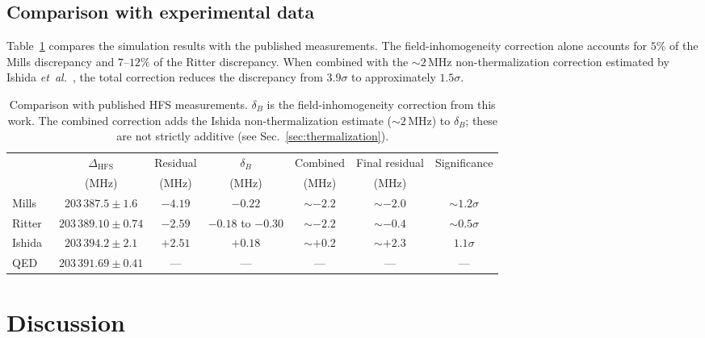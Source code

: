 \documentclass[twocolumn,pra,aps,superscriptaddress,floatfix,10pt]{revtex4-2}
\begin{document}
\subsection{Comparison with experimental data}
\label{sec:comparison}

Table~\ref{tab:comparison} compares the simulation results with the published measurements. The field-inhomogeneity correction alone accounts for $5\%$ of the Mills discrepancy and $7$--$12\%$ of the Ritter discrepancy. When combined with the $\sim 2$\,MHz non-thermalization correction estimated by Ishida \textit{et~al.}~\cite{Ishida2014}, the total correction reduces the discrepancy from $3.9\sigma$ to approximately $1.5\sigma$.

\begin{table}[t]
\caption{Comparison with published HFS measurements. $\delta_B$ is the field-inhomogeneity correction from this work. The combined correction adds the Ishida non-thermalization estimate ($\sim 2$\,MHz) to $\delta_B$; these are not strictly additive (see Sec.~\ref{sec:thermalization}).}
\label{tab:comparison}
\begin{ruledtabular}
\begin{tabular}{lcccccc}
 & $\Delta_\mathrm{HFS}$ & Residual & $\delta_B$ & Combined & Final residual & Significance \\
 & (MHz) & (MHz) & (MHz) & (MHz) & (MHz) & \\
\hline
Mills~\cite{Mills1983}  & $203\,387.5 \pm 1.6$ & $-4.19$ & $-0.22$ & $\sim -2.2$ & $\sim -2.0$ & $\sim 1.2\sigma$ \\
Ritter~\cite{Ritter1984} & $203\,389.10 \pm 0.74$ & $-2.59$ & $-0.18$ to $-0.30$ & $\sim -2.2$ & $\sim -0.4$ & $\sim 0.5\sigma$ \\
Ishida~\cite{Ishida2014} & $203\,394.2 \pm 2.1$ & $+2.51$ & $+0.18$ & $\sim +0.2$ & $\sim +2.3$ & $1.1\sigma$ \\
QED~\cite{Kniehl2000,Baker2014} & $203\,391.69 \pm 0.41$ & --- & --- & --- & --- & --- \\
\end{tabular}
\end{ruledtabular}
\end{table}

\section{Discussion}
\label{sec:discussion}
\end{document}

